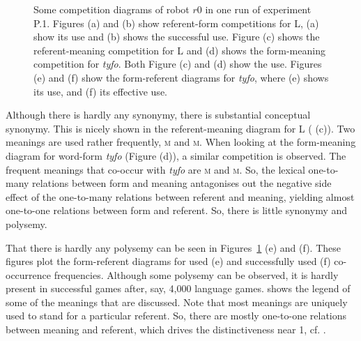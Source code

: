 \begin{figure}[p]
	\caption{Some competition diagrams of robot $r0$ in one run of experiment P.1. Figures (a) and (b) show referent-form competitions for \textsc{L}, (a) show its use and (b) shows the successful use. Figure (c) shows the referent-meaning competition for \textsc{L} and (d) shows the form-meaning competition for {\it tyfo}. Both Figure (c) and (d) show the use. Figures (e) and (f) show the form-referent diagrams for {\it tyfo}, where (e) shows its use, and (f) its effective use.}
	\label{f:opt:ggcomp1}
\end{figure}

Although there is hardly any synonymy, there is substantial conceptual synonymy. This is nicely shown in the referent-meaning diagram for \textsc{L} ( (c)). Two meanings are used rather frequently, \textsc{m} and \textsc{m}. When looking at the form-meaning diagram for word-form {\it tyfo} (Figure (d)), a similar competition is observed. The frequent meanings that co-occur with {\it tyfo} are \textsc{m} and \textsc{m}. So, the lexical one-to-many relations between form and meaning antagonises out the negative side effect of the one-to-many relations between referent and meaning, yielding almost one-to-one relations between form and referent. So, there is little synonymy and polysemy. 

That there is hardly any polysemy can be seen in Figures~\ref{f:opt:ggcomp1} (e) and (f). These figures plot the form-referent diagrams for used (e) and successfully used (f) co-occurrence frequencies. Although some polysemy can be observed, it is hardly present in successful games after, say, 4,000 language games.  shows the legend of some of the meanings that are discussed. Note that most meanings are uniquely used to stand for a particular referent. So, there are mostly one-to-one relations between meaning and referent, which drives the distinctiveness near 1, cf. .

